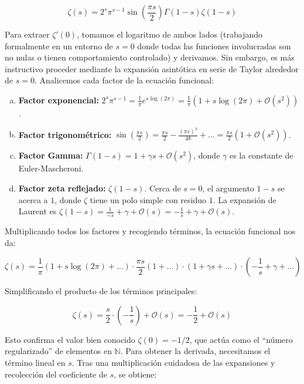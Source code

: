 $$ \zeta(s) = 2^s \pi^{s-1} \sin\left(\frac{\pi s}{2}\right) \Gamma(1-s) \zeta(1-s) $$

Para extraer $\zeta'(0)$, tomamos el logaritmo de ambos lados (trabajando formalmente en un entorno de $s=0$ donde todas las funciones involucradas son no nulas o tienen comportamiento controlado) y derivamos. Sin embargo, es más instructivo proceder mediante la expansión asintótica en serie de Taylor alrededor de $s=0$. Analicemos cada factor de la ecuación funcional:

\begin{enumerate}[a)]
    \item \textbf{Factor exponencial:} $2^s \pi^{s-1} = \frac{1}{\pi} e^{s \log(2\pi)} = \frac{1}{\pi}\left(1 + s \log(2\pi) + \mathcal{O}(s^2)\right)$.
    
    \item \textbf{Factor trigonométrico:} $\sin\left(\frac{\pi s}{2}\right) = \frac{\pi s}{2} - \frac{(\pi s)^3}{48} + \dots = \frac{\pi s}{2}\left(1 + \mathcal{O}(s^2)\right)$.
    
    \item \textbf{Factor Gamma:} $\Gamma(1-s) = 1 + \gamma s + \mathcal{O}(s^2)$, donde $\gamma$ es la constante de Euler-Mascheroni.
    
    \item \textbf{Factor zeta reflejado:} $\zeta(1-s)$. Cerca de $s=0$, el argumento $1-s$ se acerca a $1$, donde $\zeta$ tiene un polo simple con residuo $1$. La expansión de Laurent es $\zeta(1-s) = \frac{1}{-s} + \gamma + \mathcal{O}(s) = -\frac{1}{s} + \gamma + \mathcal{O}(s)$.
\end{enumerate}

Multiplicando todos los factores y recogiendo términos, la ecuación funcional nos da:

$$ \zeta(s) = \frac{1}{\pi}\left(1 + s\log(2\pi) + \dots\right) \cdot \frac{\pi s}{2}\left(1 + \dots\right) \cdot \left(1 + \gamma s + \dots\right) \cdot \left(-\frac{1}{s} + \gamma + \dots\right) $$

Simplificando el producto de los términos principales:

$$ \zeta(s) = \frac{s}{2} \cdot \left(-\frac{1}{s}\right) + \mathcal{O}(s) = -\frac{1}{2} + \mathcal{O}(s) $$

Esto confirma el valor bien conocido $\zeta(0) = -1/2$, que actúa como el ``número regularizado'' de elementos en $\mathbb{N}$. Para obtener la derivada, necesitamos el término lineal en $s$. Tras una multiplicación cuidadosa de las expansiones y recolección del coeficiente de $s$, se obtiene:

